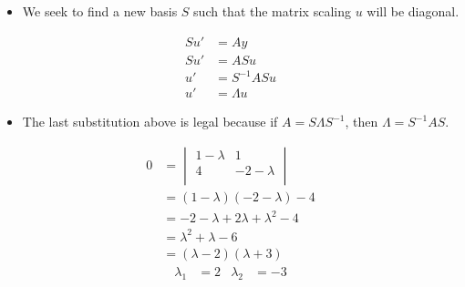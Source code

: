 \documentclass{article}
\begin{document}
\begin{itemize}
\begin{itemize}
\begin{center}
        \end{center}
        \item We seek to find a new basis $S$ such that the matrix scaling $u$ will be diagonal.
    \end{itemize}
    \begin{align*}
        Su' &= Ay\\
        Su' &= ASu\\
        u' &= S^{-1}ASu\\
        u' &= \Lambda u
    \end{align*}
    \begin{itemize}
        \item The last substitution above is legal because if $A=S\Lambda S^{-1}$, then $\Lambda=S^{-1}AS$.
    \end{itemize}
    \begin{align*}
        0 &=
        \begin{vmatrix}
            1-\lambda & 1\\
            4 & -2-\lambda\\
        \end{vmatrix}\\
        &= (1-\lambda)(-2-\lambda)-4\\
        &= -2-\lambda+2\lambda+\lambda^2-4\\
        &= \lambda^2+\lambda-6\\
        &= (\lambda-2)(\lambda+3)
    \end{align*}
    \begin{align*}
        \lambda_1 &= 2&
        \lambda_2 &= -3
    \end{align*}
\end{itemize}
\end{document}
